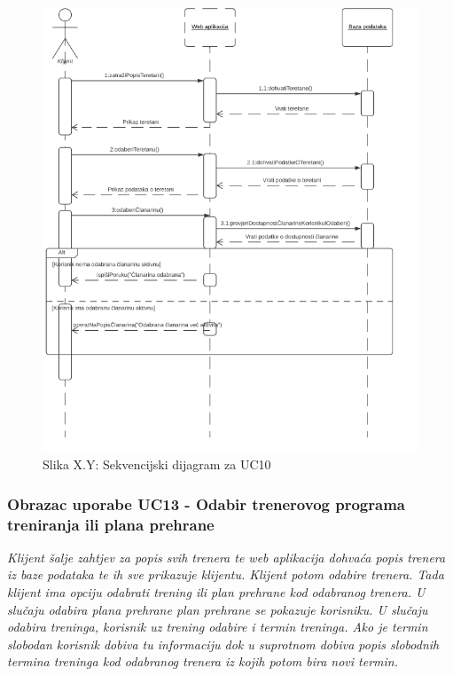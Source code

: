                     \begin{figure}[H]
			            \includegraphics[scale=1.0]{slike/UC10.PNG} %
			            \centering
			            \caption{Slika X.Y: Sekvencijski dijagram za UC10}
			            \label{fig:promjene}
		            \end{figure}
                    
                    
                    \subsubsection{Obrazac uporabe UC13 - Odabir trenerovog programa treniranja ili plana prehrane}
					\textit{Klijent šalje zahtjev za popis svih trenera te web aplikacija dohvaća popis trenera
                    iz baze podataka te ih sve prikazuje klijentu. Klijent potom odabire trenera. Tada
                    klijent ima opciju odabrati trening ili plan prehrane kod odabranog trenera. U slučaju
                    odabira plana prehrane plan prehrane se pokazuje korisniku. U slučaju odabira treninga,
                    korisnik uz trening odabire i termin treninga. Ako je termin slobodan korisnik dobiva tu
                    informaciju dok u suprotnom dobiva popis slobodnih termina treninga kod odabranog trenera
                    iz kojih potom bira novi termin.}\\
                    
